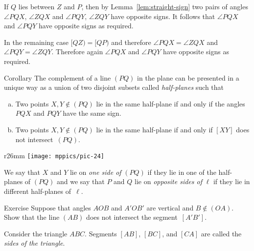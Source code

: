 If $Q$ lies between $Z$ and $P$, then by Lemma~\ref{lem:straight-sign} two pairs of angles $\angle PQX$, $\angle ZQX$ and $\angle PQY$, $\angle ZQY$ have opposite signs. 
It follows that $\angle PQX$ and $\angle PQY$ have opposite signs as required.

In the remaining case $[QZ)=[QP)$ and therefore $\angle PQX=\angle ZQX$ and $\angle PQY=\angle ZQY$. 
Therefore again $\angle PQX$ and $\angle PQY$ have opposite signs as required.
\qeds

\begin{thm}[\abs]{Corollary}\label{cor:half-plane}
The complement of a line $(PQ)$ in the plane 
can be presented in a unique way as a union of two disjoint subsets 
called \emph{half-planes}
such that 
\begin{enumerate}[(a)]
\item\label{cor:half-plane:angle} Two points $X,Y\notin(PQ)$ lie in the same half-plane if and only if the angles $PQX$ and $PQY$ have the same sign.
\item\label{cor:half-plane:intersect} Two points $X,Y\notin(PQ)$ lie in the same half-plane if and only if $[XY]$ does not intersect~$(PQ)$.
\end{enumerate}

\end{thm}

{

\begin{wrapfigure}{r}{26mm}
\vskip-4mm
\centering
\texttt{[image: mppics/pic-24]}
\end{wrapfigure}

We say that $X$ and $Y$ lie on {}\emph{one side of} $(PQ)$ if they lie in one of the half-planes of $(PQ)$ and we say that  $P$ and $Q$ lie on {}\emph{opposite sides of} $\ell$ if they lie in different half-planes of~$\ell$.


\begin{thm}{Exercise}\label{ex:vert-intersect}
Suppose that angles $AOB$ and $A'OB'$ are vertical and $B\notin (OA)$.
Show that the line $(AB)$ does not intersect the segment~$[A'B']$.
\end{thm}

}

Consider the triangle $ABC$.
Segments $[AB]$, $[BC]$, and $[CA]$ are called the \emph{sides of the triangle}.


